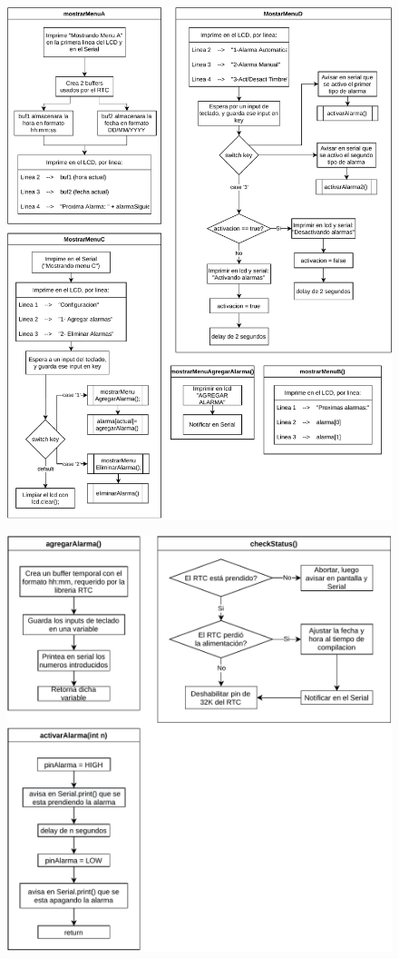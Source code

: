 \documentclass{article}
\begin{document}
\begin{figure}[H]
	\centering
	\includegraphics[width=\textwidth]
	{flujo_menus.pdf}
\end{figure} \clearpage
\begin{figure}[H]
	\centering
	\includegraphics[width=\textwidth]
	{flujo_acciones.pdf}
\end{figure}
\end{document}
